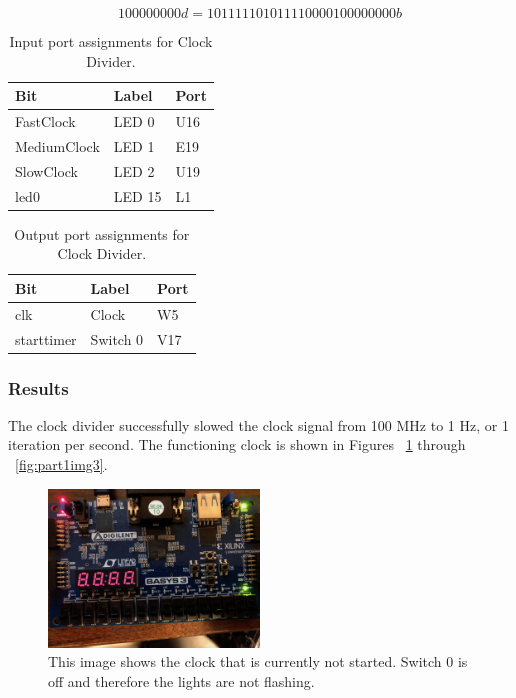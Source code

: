 \documentclass[11pt]{article}
\begin{document}
\begin{equation}
100 000 000d = 101111101011110000100000000b
\label{eqn:decimal_to_binary}
\end{equation}

\begin{table}[H]
\begin{center}
\begin{tabular}{| l | l | l |}
	\hline
	Bit & Label & Port \\ \hline
	FastClock & LED 0 & U16 \\ \hline
	MediumClock & LED 1 & E19 \\ \hline
	SlowClock & LED 2 & U19 \\ \hline
	led0 & LED 15 & L1 \\ \hline
\end{tabular}
\caption{\label{tab:clockDivider_input_Ports}Input port assignments for Clock Divider.}
\end{center}
\end{table}

\begin{table}[H]
\begin{center}
\begin{tabular}{| l | l | l |}
	\hline
	Bit & Label & Port \\ \hline
	clk & Clock & W5 \\ \hline
	starttimer & Switch 0 & V17 \\ \hline
\end{tabular}
\caption{\label{tab:clockDivider_output_Ports}Output port assignments for Clock Divider.}
\end{center}
\end{table}

\subsubsection{Results}
The clock divider successfully slowed the clock signal from 100 MHz to 1 Hz, or 1 iteration per second. The functioning clock is shown in Figures ~\ref{fig:part1img1} through ~\ref{fig:part1img3}.

\begin{center}
\begin{figure}[H]
	\includegraphics[width=0.5\textwidth]{./images/Part1/IMG_0574.jpg}
	\caption{\label{fig:part1img1}This image shows the clock that is currently not started. Switch 0 is off and therefore the lights are not flashing.}
\end{figure}
\end{center}
\end{document}
